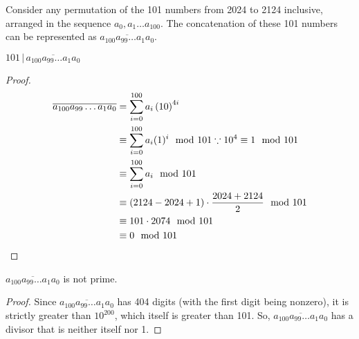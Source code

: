\documentclass[10pt]{../usamts}
\begin{document}
\begin{solution}

Consider any permutation of the 101 numbers from 2024 to 2124 inclusive, arranged in the sequence $a_0, a_1 \dots a_{100}$. The concatenation of these 101 numbers can be represented as $\overline{a_{100} a_{99} \dots a_{1} a_{0}}$.

\begin{claim}
    $101\,|\,\overline{a_{100} a_{99} \dots a_{1} a_{0}}$
\end{claim}
\begin{proof}
    \begin{align*}
    \overline{a_{100} a_{99} \dots a_{1} a_{0}}
        &= \sum_{i=0}^{100} a_i \left( 10 \right)^{4i} \\
        &\equiv \sum_{i=0}^{100} a_i (1)^i \mod 101 \because 10^4 \equiv 1 \mod 101\\
        &\equiv \sum_{i=0}^{100} a_i \mod 101 \\
        &\equiv (2124 - 2024 + 1) \cdot \frac{2024 + 2124}{2} \mod 101 \\
        &\equiv 101 \cdot 2074 \mod 101 \\
        &\equiv 0 \mod 101
    \end{align*}
\end{proof}
\begin{claim}
    $\overline{a_{100} a_{99} \dots a_{1} a_{0}}$ is not prime.
\end{claim}
\begin{proof}
    Since $\overline{a_{100} a_{99} \dots a_{1} a_{0}}$ has 404 digits (with the first digit being nonzero), it is strictly greater than $10^{200}$, which itself is greater than 101. So, $\overline{a_{100} a_{99} \dots a_{1} a_{0}}$ has a divisor that is neither itself nor 1.
\end{proof}

\end{solution}
\end{document}
